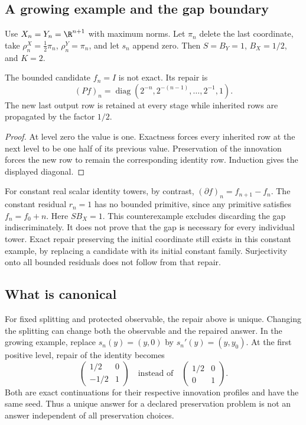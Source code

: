 \subsection{A growing example and the gap boundary}
Use \(X_n=Y_n=\R^{n+1}\) with maximum norms. Let \(\pi_n\) delete the last coordinate, take \(\rho^X_n=\tfrac12\pi_n\), \(\rho^Y_n=\pi_n\), and let \(s_n\) append zero. Then \(S=B_Y=1\), \(B_X=1/2\), and \(K=2\).

\begin{example}\label{KS22}
The bounded candidate \(f_n=I\) is not exact. Its repair is
\[
 (Pf)_n=\operatorname{diag}(2^{-n},2^{-(n-1)},\ldots,2^{-1},1).
\]
The new last output row is retained at every stage while inherited rows are propagated by the factor \(1/2\).
\end{example}
\begin{proof}
At level zero the value is one. Exactness forces every inherited row at the next level to be one half of its previous value. Preservation of the innovation forces the new row to remain the corresponding identity row. Induction gives the displayed diagonal.
\end{proof}
For constant real scalar identity towers, by contrast, \((\partial f)_n=f_{n+1}-f_n\). The constant residual \(r_n=1\) has no bounded primitive, since any primitive satisfies \(f_n=f_0+n\). Here \(SB_X=1\). This counterexample excludes discarding the gap indiscriminately. It does not prove that the gap is necessary for every individual tower. Exact repair preserving the initial coordinate still exists in this constant example, by replacing a candidate with its initial constant family. Surjectivity onto all bounded residuals does not follow from that repair.

\subsection{What is canonical}
For fixed splitting and protected observable, the repair above is unique. Changing the splitting can change both the observable and the repaired answer. In the growing example, replace \(s_n(y)=(y,0)\) by \(s_n'(y)=(y,y_0)\). At the first positive level, repair of the identity becomes
\[
 \begin{pmatrix}1/2&0\\-1/2&1\end{pmatrix}
 \quad\text{instead of}\quad
 \begin{pmatrix}1/2&0\\0&1\end{pmatrix}.
\]
Both are exact continuations for their respective innovation profiles and have the same seed. Thus a unique answer for a declared preservation problem is not an answer independent of all preservation choices.

